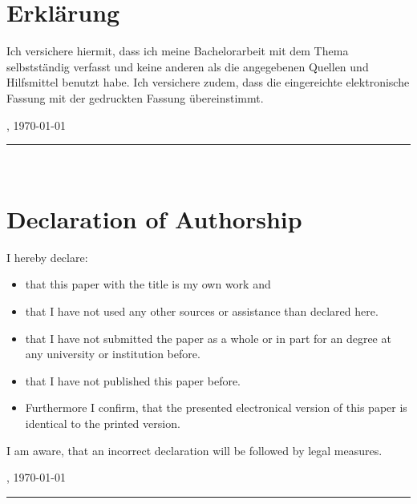 \clearpage


\chapter*{Erklärung}
\thispagestyle{scrheadings}
Ich versichere hiermit, dass ich meine Bachelorarbeit mit dem Thema \textit{\dertitel} selbstständig verfasst und keine anderen als die angegebenen Quellen und Hilfsmittel
benutzt habe.
Ich versichere zudem, dass die eingereichte elektronische Fassung mit der gedruckten Fassung
übereinstimmt.

\vspace{3cm}
\derort, \today
\vspace{3em}

\rule{6cm}{0.4pt}\\
\derautor

\clearpage


\chapter*{Declaration of Authorship}
\thispagestyle{scrheadings}



I hereby declare:

\begin{itemize}
	\item that this paper with the title \textit{\dertitel} is my own work and
	\item that I have not used any other sources or assistance than declared here.
	\item that I have not submitted the paper as a whole or in part for an degree at any university
		or institution before.
	\item that I have not published this paper before.
	\item Furthermore I confirm, that the presented electronical version of this paper
		is identical to the printed version.
\end{itemize}
I am aware, that an incorrect declaration will be followed by legal measures.

\vspace{3cm}
\derort, \today
\vspace{3em}

\rule{6cm}{0.4pt}\\
\derautor

